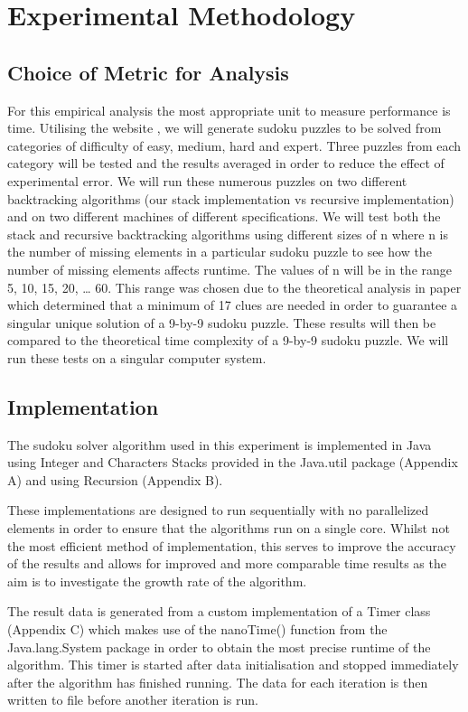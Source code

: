 \documentclass[11pt]{article}
\begin{document}
\section{Experimental Methodology}
\subsection{Choice of Metric for Analysis}
For this empirical analysis the most appropriate unit to measure performance is time. 
Utilising the website \cite{GGRL}, we will generate sudoku puzzles to be solved from categories of difficulty of easy, medium, hard and expert. 
Three puzzles from each category will be tested and the results averaged in order to reduce the effect of experimental error. 
We will run these numerous puzzles on two different backtracking algorithms (our stack implementation vs recursive implementation) and on two different machines of different specifications.
We will test both the stack and recursive backtracking algorithms using different sizes of n where n is the number of missing elements in a particular sudoku 
puzzle to see how the number of missing elements affects runtime. The values of n will be in the range {5, 10, 15, 20, … 60}.
 This range was chosen due to the theoretical analysis in paper \cite{SJAR} which determined that a minimum of 17 clues are needed in order to guarantee a singular unique 
 solution of a 9-by-9 sudoku puzzle. These results will then be compared to the theoretical time complexity of a 9-by-9 sudoku puzzle. We will run these tests on a singular computer system.

\subsection{Implementation}
The sudoku solver algorithm used in this experiment is implemented in Java using Integer and Characters Stacks provided in the Java.util package (Appendix A) and using Recursion (Appendix B).

\vspace{5mm} %
These implementations are designed to run sequentially with no parallelized elements in order to ensure that the algorithms run on a single core. 
Whilst not the most efficient method of implementation, this serves to improve the accuracy of the results and allows for improved and more comparable time results as the aim 
is to investigate the growth rate of the algorithm.

\vspace{5mm} %
The result data is generated from a custom implementation of a Timer class (Appendix C) which makes use of the nanoTime() function from the Java.lang.System package in 
order to obtain the most precise runtime of the algorithm. This timer is started after data initialisation and stopped immediately after the algorithm has finished running. 
The data for each iteration is then written to file before another iteration is run.
\end{document}
